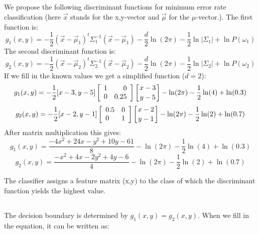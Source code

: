 \documentclass[10pt]{article}
\begin{document}
\subsection{}
We propose the following discriminant functions for minimum error rate classification (here $\vec x$ stands for the x,y-vector and $\vec\mu$ for the $\mu$-vector.). The first function is:
\begin{equation}
g_1(x, y)=-\frac{1}{2}(\vec x-\vec\mu_1)^t\Sigma_1^{-1}(\vec x-\vec\mu_1)-\frac{d}{2}\ln(2\pi)-\frac{1}{2}\ln|\Sigma_1|+\ln P(\omega_1)
\end{equation}
The second discriminant function is:
\begin{equation}
g_2(x, y)=-\frac{1}{2}(\vec x-\vec\mu_2)^t\Sigma_2^{-1}(\vec x-\vec\mu_2)-\frac{d}{2}\ln(2\pi)-\frac{1}{2}\ln|\Sigma_2|+\ln P(\omega_2)
\end{equation}
If we fill in the known values we get a simplified function ($d=2$):
\begin{equation}
g_1(x, y)=
-\frac{1}{2}[x-3, y-5] 
\left[\begin{array}{lr}1 & 0 \\0 & 0.25 \end{array}\right] 
\left[x-3 \atop y-5\right]-\ln(2\pi)-\frac{1}{2}\ln(4)+\ln (0.3)
\end{equation}
\begin{equation}
g_2(x, y)=-\frac{1}{2}[x-2,y-1]
\left[\begin{array}{lr}0.5 & 0 \\0 & 1 \end{array}\right] 
\left[x-2 \atop y-1\right]-\ln(2\pi)-\frac{1}{2}\ln(2)+\ln (0.7)
\end{equation}
After matrix multiplication this gives:
\begin{equation}
g_1(x, y)= \frac{-4x^2+24x-y^2+10y-61}{8}
-\ln(2\pi)-\frac{1}{2}\ln(4)+\ln (0.3)
\end{equation}
\begin{equation}
g_2(x, y)= \frac{-x^2+4x-2y^2+4y-6}{4}
-\ln(2\pi)-\frac{1}{2}\ln(2)+\ln (0.7)
\end{equation}

The classifier assigns a feature matrix (x,y) to the class of which the discriminant function yields the highest value.

\subsection{}
The decision boundary is determined by $g_1(x,y) = g_2(x,y)$. When we fill in the equation, it can be written as:
\end{document}
